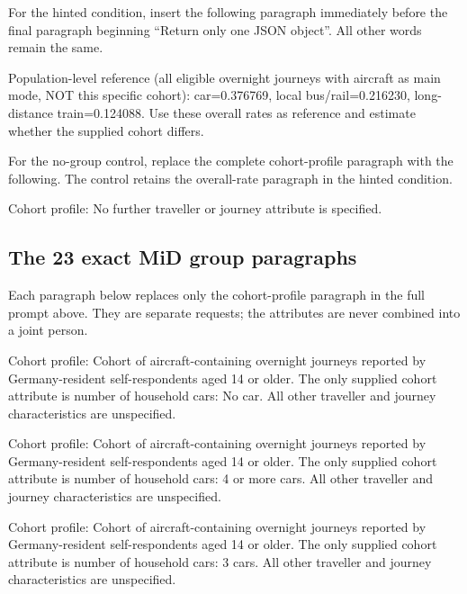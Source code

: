 For the hinted condition, insert the following paragraph immediately before the final paragraph beginning ``Return only one JSON object''. All other words remain the same.

\begin{promptbox}[title={Exact paragraph added for the MiD hint condition}]
Population-level reference (all eligible overnight journeys with aircraft as main mode, NOT this specific cohort): car=0.376769, local bus/rail=0.216230, long-distance train=0.124088. Use these overall rates as reference and estimate whether the supplied cohort differs.
\end{promptbox}


For the no-group control, replace the complete cohort-profile paragraph with the following. The control retains the overall-rate paragraph in the hinted condition.

\begin{promptbox}[title={Exact MiD no-group replacement}]
Cohort profile: No further traveller or journey attribute is specified.
\end{promptbox}


\subsection{The 23 exact MiD group paragraphs}

Each paragraph below replaces only the cohort-profile paragraph in the full prompt above. They are separate requests; the attributes are never combined into a joint person.

\begin{promptbox}[title={Number of household cars: No car}]
Cohort profile: Cohort of aircraft-containing overnight journeys reported by Germany-resident self-respondents aged 14 or older. The only supplied cohort attribute is number of household cars: No car. All other traveller and journey characteristics are unspecified.
\end{promptbox}


\begin{promptbox}[title={Number of household cars: 4 or more cars}]
Cohort profile: Cohort of aircraft-containing overnight journeys reported by Germany-resident self-respondents aged 14 or older. The only supplied cohort attribute is number of household cars: 4 or more cars. All other traveller and journey characteristics are unspecified.
\end{promptbox}


\begin{promptbox}[title={Number of household cars: 3 cars}]
Cohort profile: Cohort of aircraft-containing overnight journeys reported by Germany-resident self-respondents aged 14 or older. The only supplied cohort attribute is number of household cars: 3 cars. All other traveller and journey characteristics are unspecified.
\end{promptbox}


